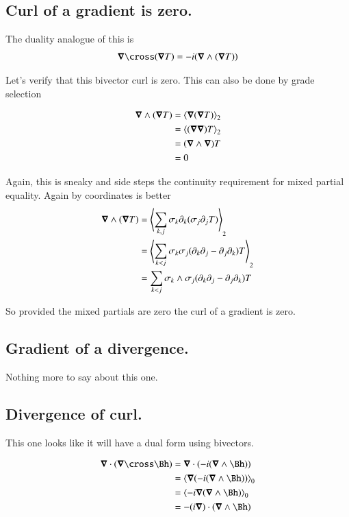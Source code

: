 \documentclass{article}
\begin{document}
\subsection{ Curl of a gradient is zero. }

The duality analogue of this is
\begin{align*}
\spacegrad \cross (\spacegrad T) = -i(\spacegrad \wedge (\spacegrad T))
\end{align*}

Let's verify that this bivector curl is zero.  This can also be done by grade selection

\begin{align*}
\boldsymbol{\nabla} \wedge (\boldsymbol{\nabla} T) 
&= {\left\langle{{\boldsymbol{\nabla}(\boldsymbol{\nabla}T)}}\right\rangle}_{2} \\
&= {\left\langle{{(\boldsymbol{\nabla}\boldsymbol{\nabla}) T}}\right\rangle}_{2} \\
&= (\boldsymbol{\nabla} \wedge \boldsymbol{\nabla}) T \\
&= 0
\end{align*}

Again, this is sneaky and side steps the continuity requirement for mixed partial equality.  Again by coordinates is better
\begin{align*}
\boldsymbol{\nabla} \wedge (\boldsymbol{\nabla} T) 
&= {\left\langle{{\sum_{k,j}\sigma_k \partial_k (\sigma_j \partial_j T)}}\right\rangle}_{2} \\
&= {\left\langle{{\sum_{k<j}\sigma_k \sigma_j (\partial_k \partial_j - \partial_j \partial_k) T}}\right\rangle}_{2} \\
&= \sum_{k<j} \sigma_k \wedge \sigma_j (\partial_k \partial_j - \partial_j \partial_k) T \\
\end{align*}

So provided the mixed partials are zero the curl of a gradient is zero.

\subsection{ Gradient of a divergence. }

Nothing more to say about this one.

\subsection{ Divergence of curl. }

This one looks like it will have a dual form using bivectors.

\begin{align*}
\spacegrad \cdot (\spacegrad \cross \Bh)
&= \spacegrad \cdot (-i (\spacegrad \wedge \Bh)) \\
&= \gpgradezero{\spacegrad (-i (\spacegrad \wedge \Bh))} \\
&= \gpgradezero{-i \spacegrad (\spacegrad \wedge \Bh)} \\
&= -(i \spacegrad) \cdot (\spacegrad \wedge \Bh) \\
\end{align*}
\end{document}
